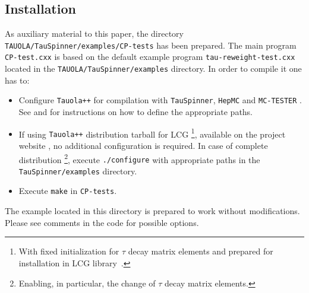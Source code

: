 \documentclass[12pt]{article}
\begin{document}
\subsection{Installation}
\label{sec:installation}

As  auxiliary material to this paper, the directory {\tt TAUOLA/TauSpinner/examples/CP-tests}
has been prepared. The main program {\tt CP-test.cxx} is based on
the default example program {\tt tau-reweight-test.cxx} located in the {\tt TAUOLA/TauSpinner/examples}
directory. In order to compile it one has to:

\begin{itemize}
\item Configure {\tt Tauola++} for compilation with {\tt TauSpinner},
      {\tt HepMC} \cite{Dobbs:2001ck} and {\tt MC-TESTER} \cite{Davidson:2008ma}.
      See \cite{Davidson:2010rw} and \cite{Czyczula:2012ny} for instructions on how to define the appropriate paths.
\item If using {\tt Tauola++} distribution tarball for LCG%
      \footnote{With fixed initialization for $\tau$ decay matrix elements
                and prepared for installation in LCG library~\cite{LCG}.},
      available on the project website \cite{tauolapp:website}, no additional
      configuration is required. In case of complete distribution%
      \footnote{Enabling, in particular, the change of $\tau$ decay matrix elements.},
      execute {\tt ./configure} with appropriate paths in the {\tt TauSpinner/examples} directory.
\item Execute {\tt make} in {\tt CP-tests}.
\end{itemize}

The example located in this directory is prepared to work without  modifications.
Please see comments in the code for possible options.
\end{document}
